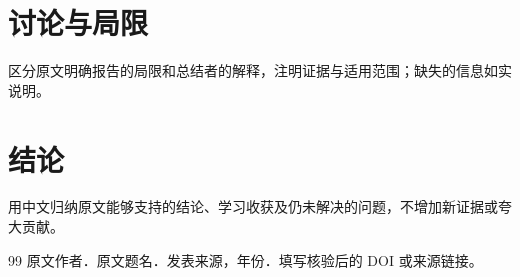 \documentclass[UTF8,fontset=fandol,zihao=-4,a4paper]{ctexart}
\begin{document}

\section{讨论与局限}
区分原文明确报告的局限和总结者的解释，注明证据与适用范围；缺失的信息如实说明。

\section{结论}
用中文归纳原文能够支持的结论、学习收获及仍未解决的问题，不增加新证据或夸大贡献。

\begin{thebibliography}{99}
原文作者．原文题名．发表来源，年份．填写核验后的 DOI 或来源链接。
\end{thebibliography}
\end{document}
